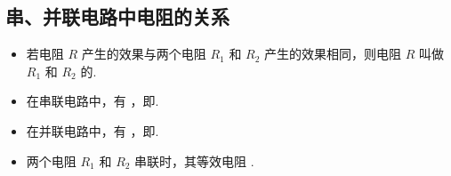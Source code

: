 \subsection{串、并联电路中电阻的关系}
\begin{itemize}
\item 若电阻 $R$ 产生的效果与两个电阻 $R_1$ 和 $R_2$ 产生的效果相同，则电阻 $R$ 叫做 $R_1$ 和 $R_2$ 的.
\item 在串联电路中，有 ，即.
\item 在并联电路中，有 ，即. 
\item 两个电阻 $R_1$ 和 $R_2$ 串联时，其等效电阻 .
\end{itemize}